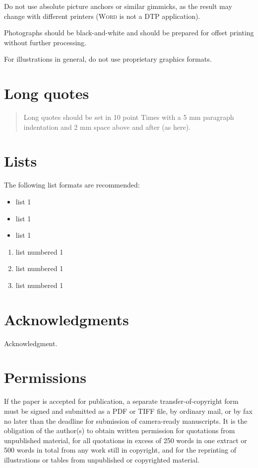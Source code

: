 \documentclass{ecscw2007}
\begin{document}
Do not use absolute picture anchors or similar gimmicks, as the result may change with different printers (\textsc{Word} is not a DTP application).

Photographs should be black-and-white and should be prepared for offset printing without further processing.

For illustrations in general, do not use proprietary graphics formats.

\section*{Long quotes}

\begin{quotation}
Long quotes should be set in 10 point Times with a 5 mm paragraph indentation and 2 mm space above and after  (as here).
\end{quotation}

\section*{Lists}

The following list formats are recommended:

\begin{itemize}
\setlength{\itemsep}{0pt}
\item list 1
\item list 1
\item list 1
\end{itemize}

\begin{enumerate}
\item list numbered 1
\item list numbered 1
\item list numbered 1
\end{enumerate}

\section*{Acknowledgments}

\small
Acknowledgment.
\normalsize

\small
\nocite{*}



\normalsize

\section*{Permissions}

If the paper is accepted for publication, a separate transfer-of-copyright form must be signed and submitted as a PDF or TIFF file, by ordinary mail, or by fax no later than the deadline for submission of camera-ready manuscripts. It is the obligation of the author(s) to obtain written permission for quotations from unpublished material, for all quotations in excess of 250 words in one extract or 500 words in total from any work still in copyright, and for the reprinting of illustrations or tables from unpublished or copyrighted material.
\end{document}
